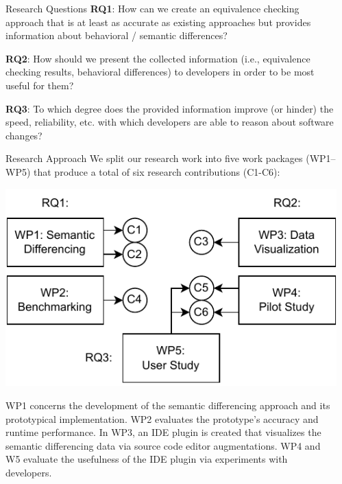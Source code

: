 \documentclass[final,hyperref={pdfpagelabels=false}]{beamer}
\begin{document}
\begin{frame}[t]
\begin{columns}[t]
\begin{column}{.47\textwidth}
    \begin{block}{Research Questions}
      \textbf{RQ1}: How can we create an equivalence checking approach that is at least as accurate as existing approaches but provides information about behavioral / semantic differences?
      \vspace{.4ex}

      \textbf{RQ2}: How should we present the collected information (i.e., equivalence checking results, behavioral differences) to developers in order to be most useful for them?
      \vspace{.4ex}

      \textbf{RQ3}: To which degree does the provided information improve (or hinder) the speed, reliability, etc. with which developers are able to reason about software changes?
    \end{block}

    \begin{block}{Research Approach}
      We split our research work into five work packages (WP1–WP5) that produce a total of six research contributions (C1-C6):

      \begin{center}
        \includegraphics[width=0.8\columnwidth]{research-approach.drawio}
      \end{center}

      WP1 concerns the development of the semantic differencing approach and its prototypical implementation. WP2 evaluates the prototype's accuracy and runtime performance. In WP3, an IDE plugin is created that visualizes the semantic differencing data via source code editor augmentations. WP4 and W5 evaluate the usefulness of the IDE plugin via experiments with developers.
    \end{block}
  \end{column} %

  \begin{column}{.02\textwidth}\end{column} %
   

\end{columns}
\end{frame}
\end{document}
